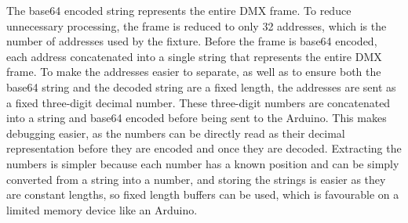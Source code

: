 The base64 encoded string represents the entire DMX frame.
To reduce unnecessary processing, the frame is reduced to only 32 addresses, which is the number of addresses used by the fixture.
Before the frame is base64 encoded, each address concatenated into a single string that represents the entire DMX frame.
To make the addresses easier to separate, as well as to ensure both the base64 string and the decoded string are a fixed length,
the addresses are sent as a fixed three-digit decimal number.
These three-digit numbers are concatenated into a string and base64 encoded before being sent to the Arduino.
This makes debugging easier, as the numbers can be directly read as their decimal representation before they are encoded and once they are decoded.
Extracting the numbers is simpler because each number has a known position and can be simply converted from a string into a number,
and storing the strings is easier as they are constant lengths, so fixed length buffers can be used,
which is favourable on a limited memory device like an Arduino.
